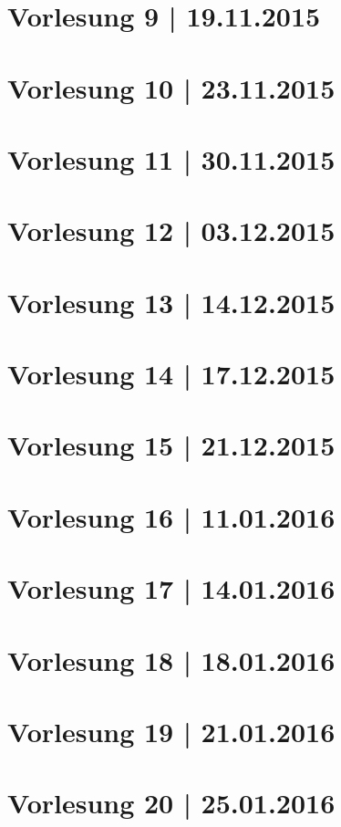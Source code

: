 \newpage
\part*{Vorlesung 9 | 19.11.2015}

\newpage
\part*{Vorlesung 10 | 23.11.2015}

\newpage
\part*{Vorlesung 11 | 30.11.2015}

\newpage
\part*{Vorlesung 12 | 03.12.2015}


\newpage
\part*{Vorlesung 13 | 14.12.2015}

\newpage
\part*{Vorlesung 14 | 17.12.2015}

\newpage
\part*{Vorlesung 15 | 21.12.2015}


\newpage
\part*{Vorlesung 16 | 11.01.2016}


\newpage
\part*{Vorlesung 17 | 14.01.2016}


\newpage
\part*{Vorlesung 18 | 18.01.2016}

\newpage
\part*{Vorlesung 19 | 21.01.2016}


\newpage
\part*{Vorlesung 20 | 25.01.2016}

